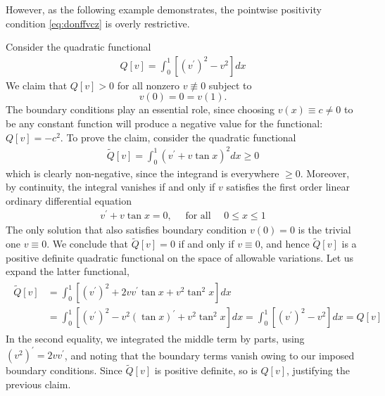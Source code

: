 \documentclass{article}
\begin{document}
However, as the following example demonstrates, the pointwise positivity condition \cref{eq:donffvcz} is overly restrictive.
\begin{exma}
Consider the quadratic functional
\begin{align}
Q[v]=\int_{0}^{1}\left[\left(v^{\prime}\right)^{2}-v^{2}\right] d x \label{eq:dkcnafdas}
\end{align}
We claim that $Q[v]>0$ for all nonzero $v \not \equiv 0$ subject to 
$$v(0)=0=v(1).$$ The boundary conditions play an essential role, since choosing $v(x) \equiv c \neq 0$ to be any constant function will produce a negative value for the functional: $Q[v]=-c^{2}$.
To prove the claim, consider the quadratic functional
\begin{align*}
\widetilde{Q}[v]=\int_{0}^{1}\left(v^{\prime}+v \tan x\right)^{2} d x \geq 0
\end{align*}
which is clearly non-negative, since the integrand is everywhere $\geq 0$. Moreover, by continuity, the integral vanishes if and only if $v$ satisfies the first order linear ordinary differential equation
\begin{align*}
v^{\prime}+v \tan x=0, \quad \text { for all } \quad 0 \leq x \leq 1
\end{align*}
The only solution that also satisfies boundary condition $v(0)=0$ is the trivial one $v \equiv 0$. We conclude that $\widetilde{Q}[v]=0$ if and only if $v \equiv 0$, and hence $\widetilde{Q}[v]$ is a positive definite quadratic functional on the space of allowable variations.
Let us expand the latter functional,
\begin{align*}
\begin{aligned}
\widetilde{Q}[v] &=\int_{0}^{1}\left[\left(v^{\prime}\right)^{2}+2 v v^{\prime} \tan x+v^{2} \tan ^{2} x\right] d x \\
&=\int_{0}^{1}\left[\left(v^{\prime}\right)^{2}-v^{2}(\tan x)^{\prime}+v^{2} \tan ^{2} x\right] d x=\int_{0}^{1}\left[\left(v^{\prime}\right)^{2}-v^{2}\right] d x=Q[v]
\end{aligned}
\end{align*}
In the second equality, we integrated the middle term by parts, using $\left(v^{2}\right)^{\prime}=2 v v^{\prime}$, and noting that the boundary terms vanish owing to our imposed boundary conditions. Since $\widetilde{Q}[v]$ is positive definite, so is $Q[v]$, justifying the previous claim.
\end{exma} 
\end{document}
